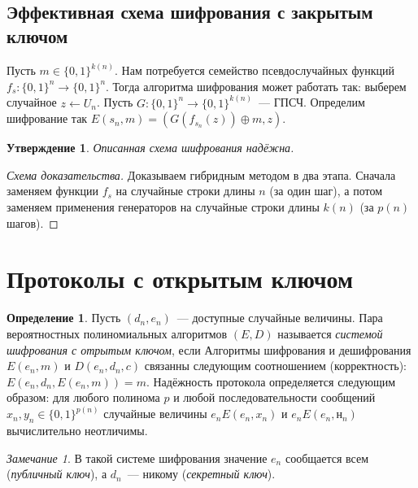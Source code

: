 \documentclass[12pt]{article}
\newcommand{\bits}{\{0,1\}}
\theoremstyle{definition}
\newtheorem{definition}{Определение}[section]
\theoremstyle{plain}
\newtheorem{statement}{Утверждение}[section]
\theoremstyle{remark}
\newtheorem{remark}{Замечание}[section]
\begin{document}
\subsection{Эффективная схема шифрования с закрытым ключом}
Пусть $m\in\bits^{k(n)}$. Нам потребуется семейство псевдослучайных
функций $f_{s}: \bits^n\to\bits^{n}$. Тогда алгоритма шифрования
может работать так: выберем случайное $z\gets U_{n}$. 
Пусть $G:\bits^n\to\bits^{k(n)}$~--- ГПСЧ. 
Определим шифрование так $E(s_n, m) = (G(f_{s_n}(z))\oplus m, z)$. 
\begin{statement}
Описанная схема шифрования надёжна.
\end{statement}
\begin{proof}[Схема доказательства]
Доказываем гибридным методом в два этапа. 
Сначала заменяем функции $f_s$ на случайные строки длины $n$ (за один шаг), а потом заменяем применения генераторов на случайные строки длины $k(n)$ (за $p(n)$ шагов). 
\end{proof}

\section{Протоколы с открытым ключом}
\begin{definition}
Пусть $(d_n, e_n)$~--- доступные случайные величины. Пара вероятностных полиномиальных алгоритмов $(E,D)$ называется 
\emph{системой шифрования с отрытым ключом},
если 
Алгоритмы шифрования и дешифрования $E(e_n,m)$ и $D(e_n,d_n,c)$ связанны следующим соотношением (корректность):
$E(e_n, d_n, E(e_n, m)) = m$.
Надёжность протокола определяется следующим
образом: для любого полинома $p$
и любой последовательности сообщений
$x_n,y_n\in\bits^{p(n)}$ случайные величины
$e_nE(e_n, x_n)$ и $e_nE(e_n, н_n)$
вычислительно неотличимы.

\end{definition}
\begin{remark}
В такой системе шифрования значение $e_n$ сообщается всем (\emph{публичный ключ}), 
а $d_n$~--- никому (\emph{секретный ключ}). 
\end{remark}
\end{document}
